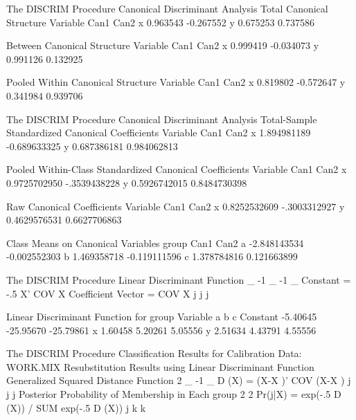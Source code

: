 \documentclass{article}
\begin{document}
\begin{Woutput}
The DISCRIM Procedure
Canonical Discriminant Analysis
         Total Canonical Structure
Variable              Can1              Can2
x                 0.963543         -0.267552
y                 0.675253          0.737586

        Between Canonical Structure
Variable              Can1              Can2
x                 0.999419         -0.034073
y                 0.991126          0.132925

     Pooled Within Canonical Structure
Variable              Can1              Can2
x                 0.819802         -0.572647
y                 0.341984          0.939706

The DISCRIM Procedure
Canonical Discriminant Analysis
Total-Sample Standardized Canonical Coefficients
Variable              Can1              Can2
x              1.894981189      -0.689633325
y              0.687386181       0.984062813

Pooled Within-Class Standardized Canonical Coefficients
Variable              Can1              Can2
x             0.9725702950      -.3539438228
y             0.5926742015      0.8484730398

         Raw Canonical Coefficients
Variable              Can1              Can2
x             0.8252532609      -.3003312927
y             0.4629576531      0.6627706863

   Class Means on Canonical Variables
group              Can1              Can2
a          -2.848143534      -0.002552303
b           1.469358718      -0.119111596
c           1.378784816       0.121663899

The DISCRIM Procedure
Linear Discriminant Function
               _     -1 _                              -1 _
Constant = -.5 X' COV   X      Coefficient Vector = COV   X
                j        j                                 j

      Linear Discriminant Function for group
Variable             a             b             c
Constant      -5.40645     -25.95670     -25.79861
x              1.60458       5.20261       5.05556
y              2.51634       4.43791       4.55556

The DISCRIM Procedure
Classification Results for Calibration Data: WORK.MIX
Resubstitution Results using Linear Discriminant Function
Generalized Squared Distance Function
 2         _       -1   _
D (X) = (X-X )' COV  (X-X )
 j          j            j
Posterior Probability of Membership in Each group
                   2                    2
Pr(j|X) = exp(-.5 D (X)) / SUM exp(-.5 D (X))
                   j        k           k


\end{Woutput}
\end{document}
